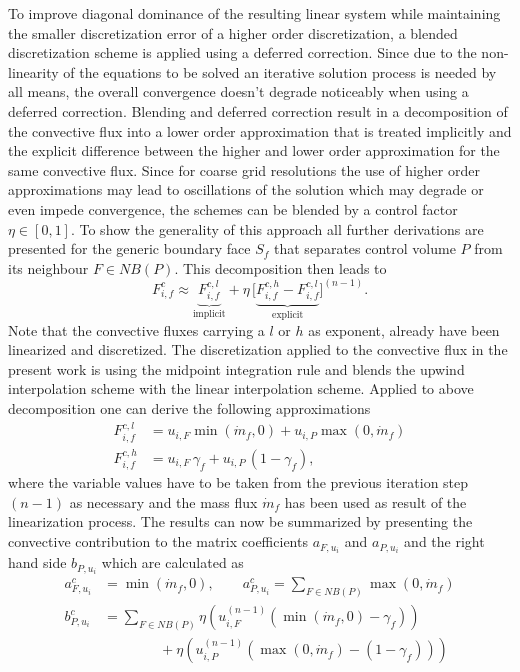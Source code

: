       To improve diagonal dominance of the resulting linear system while maintaining the smaller discretization error of a higher order discretization, a blended discretization scheme is applied using a deferred correction. Since due to the non-linearity of the equations to be solved an iterative solution process is needed by all means, the overall convergence doesn't degrade noticeably when using a deferred correction. Blending and deferred correction result in a decomposition of the convective flux into a lower order approximation that is treated implicitly and the explicit difference between the higher and lower order approximation for the same convective flux. Since for coarse grid resolutions the use of higher order approximations may lead to oscillations of the solution which may degrade or even impede convergence, the schemes can be blended by a control factor \( \eta \in [0,1]\). To show the generality of this approach all further derivations are presented for the generic boundary face \(S_f\) that separates control volume \(P\) from its neighbour \(F \in NB(P)\). This decomposition then leads to
      \begin{displaymath}
        F_{i,f}^c \approx  \underbrace{F_{i,f}^{c,l}}_{\text{implicit}} + \eta \, \bigl[\underbrace{ F_{i,f}^{c,h} - F_{i,f}^{c,l} }_{\text{explicit}}\bigr]^{(n-1)}.
      \end{displaymath}
      Note that the convective fluxes carrying a \(l\) or \(h\) as exponent, already have been linearized and discretized. The discretization applied to the convective flux in the present work is using the midpoint integration rule and blends the upwind interpolation scheme with the linear interpolation scheme. Applied to above decomposition one can derive the following approximations
      \begin{align*}
        F_{i,f}^{c,l} &= u_{i,F} \min(\dot{m}_f ,0) + u_{i,P} \max(0,\dot{m}_f) \\
        F_{i,f}^{c,h} &= u_{i,F} \, \gamma_f + u_{i,P} \, (1 - \gamma_f),
      \end{align*}
      where the variable values have to be taken from the previous iteration step \((n-1)\) as necessary and the mass flux \(\dot{m}_f\) has been used as result of the linearization process. The results can now be summarized by presenting the convective contribution to the matrix coefficients \(a_{F,u_i}\) and \(a_{P,u_i}\) and the right hand side \(b_{P,u_i}\) which are calculated as
      \begin{subequations}
      \begin{align}
        a_{F,u_i}^c &= \min(\dot{m}_f ,0), \quad \quad a_{P,u_i}^c = \sum_{F \in NB(P)} \max(0,\dot{m}_f) \\[1em]
        b_{P,u_i}^c &= \sum_{F \in NB(P)} \eta  \left(u_{i,F}^{(n-1)} \left( \min(\dot{m}_f,0) - \gamma_f \right)\right) \nonumber \\
                    &\quad \quad \quad  \quad+ \eta \left( u_{i,P}^{(n-1)} \left( \max(0,\dot{m}_f) - \left(1 - \gamma_f\right) \right)\right)
      \end{align}
    \end{subequations}

